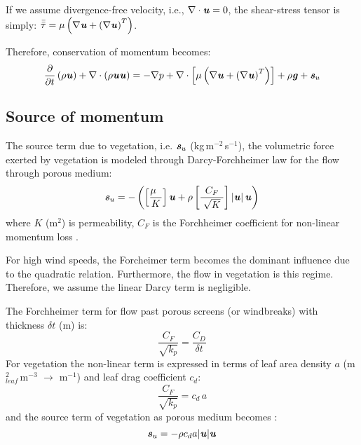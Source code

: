 \begin{assumption}
	If we assume divergence-free velocity, i.e., $\nabla \cdot \textbf{\textit{u}} = 0$, the shear-stress tensor is simply: $\bar{\bar{{\tau}}} = \mu \left( \nabla \textbf{\textit{u}} + \left(\nabla \textbf{\textit{u}} \right)^T \right)$.
\end{assumption}

Therefore, conservation of momentum becomes:
\begin{equation}
\frac{\partial}{\partial t} \left(\rho \textbf{\textit{u}} \right) + \nabla \cdot \left(\rho \textbf{\textit{u}}\textbf{\textit{u}} \right) = - \nabla p + \nabla \cdot \left[ \mu \left( \nabla \textbf{\textit{u}} + \left(\nabla \textbf{\textit{u}} \right)^T \right) \right] +  \rho \textbf{\textit{g}} +  \textbf{\textit{s}}_{u}
\end{equation}

\subsection{Source of momentum}

The source term due to vegetation, i.e. $\textbf{\textit{s}}_u$ (kg\,m$^{-2}$\,s$^{-1}$), the volumetric force exerted by vegetation is modeled through Darcy-Forchheimer law for the flow through porous medium:
\begin{equation}
\textbf{\textit{s}}_u =  - \left( {\left[ {\frac{{{\mu}\;\;}}{K}} \right]{\textbf{\textit{u}}} + {\rho}\left[ {\frac{{{C_F}}}{{\;\sqrt K \;}}} \right]\left| {\textbf{\textit{u}}} \right|{\textbf{\textit{u}}}} \right)
\label{eq:darcyforchheimer}
\end{equation}
where $K$ (m$^{2}$) is permeability, $C_F$ is the Forchheimer coefficient for non-linear momentum loss \citep{Verboven2006,Boulard2008}.

\begin{assumption}
	For high wind speeds, the Forcheimer term becomes the dominant influence due to the quadratic relation. Furthermore, the flow in vegetation is this regime. Therefore, we assume the linear Darcy term is negligible. 
\end{assumption}

The Forchheimer term for flow past porous screens (or windbreaks) with thickness $\delta t$ (m) is: 
\begin{equation}
\frac{{{C_F}}}{{\sqrt {{k_p}} }} = \frac{{{C_D}}}{{\delta t}}
\end{equation}
For vegetation the non-linear term is expressed in terms of leaf area density $a$ (m$^2_{\textit{leaf}}$\,m$^{-3}$ $\rightarrow$ m$^{-1}$) and leaf drag coefficient $c_d$:
\begin{equation}
\frac{{{C_F}}}{{\sqrt {{k_p}} }} = c_d\,a
\end{equation}
and the source term of vegetation as porous medium becomes \citep{Wilson1977,Liu1996,Hiraoka,Kenjeres2013}:
\begin{equation}
\textbf{\textit{s}}_u = - \rho c_d a |\textbf{\textit{u}}| \textbf{\textit{u}}
\end{equation}

